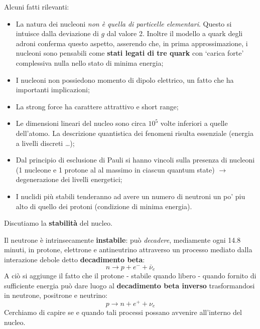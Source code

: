 Alcuni fatti rilevanti:
\begin{itemize}
    \item La natura dei nucleoni \emph{non è quella di particelle elementari}.
    Questo si intuisce dalla deviazione di $ g $ dal valore 2.
    Inoltre il modello a quark degli adroni conferma questo aspetto, asserendo che, in prima approssimazione, i
    nucleoni sono pensabili come \textbf{stati legati di tre quark} con `carica forte' complessiva nulla
    nello stato di minima energia;
    \item I nucleoni non possiedono momento di dipolo elettrico, un fatto che ha importanti implicazioni;
    \item La strong force ha carattere attrattivo e short range;
    \item Le dimensioni lineari del nucleo sono circa $ {10}^{5} $ volte inferiori a quelle dell'atomo.
    La descrizione quantistica dei fenomeni risulta essenziale (energia a livelli discreti \ldots);
    \item Dal principio di esclusione di Pauli si hanno vincoli sulla presenza di nucleoni (1 nucleone e 1 protone al
    al massimo in ciascun quantum state) $ \rightarrow $ degenerazione dei livelli energetici;
    \item I nuclidi più stabili tenderanno ad avere un numero di neutroni un po' piu alto di quello dei protoni
    (condizione di minima energia).
\end{itemize}
\bigskip

Discutiamo la \textbf{stabilità} del nucleo.

Il neutrone è intrinsecamente \textbf{instabile}: può \emph{decadere}, mediamente ogni 14.8 minuti, in protone, elettrone
e  antineutrino attraverso un processo mediato dalla interazione debole detto \textbf{decadimento beta}:
\[
   n \to p + {e}^{-} + \bar{\nu}_e
\]
A ciò si aggiunge il fatto che il protone - stabile quando libero - quando fornito di sufficiente energia può dare luogo
al \textbf{decadimento beta inverso} trasformandosi in neutrone, positrone e neutrino:
\[
 p \to n + {e}^{+} + \nu_e
\]
Cerchiamo di capire se e quando tali processi possano avvenire all'interno del nucleo.

